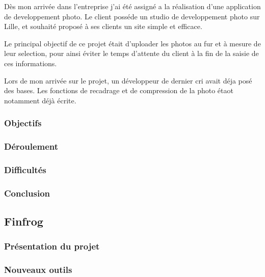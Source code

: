 \documentclass[12pt,a4paper]{article}
\begin{document}
  \bigskip

  Dès mon arrivée dans l'entreprise j'ai été assigné a la réalisation
  d'une application de developpement photo. Le client posséde un studio de
  developpement photo sur Lille, et souhaité proposé à ses clients un site
  simple et efficace.

  \bigskip

  Le principal objectif de ce projet était d'uploader les photos au fur et
  à mesure de leur selection, pour ainsi éviter le temps d'attente du
  client à la fin de la saisie de ces informations.

  \bigskip

  Lors de mon arrivée sur le projet, un développeur de dernier cri avait
  déja posé des bases. Les fonctions de recadrage et de compression de la
  photo étaot notamment déjà écrite.

  \bigskip

  \subsubsection{Objectifs}\label{objectifs}

  \subsubsection{Déroulement}\label{duxe9roulement}

  \subsubsection{Difficultés}\label{difficultuxe9s}

  \subsubsection{Conclusion}\label{conclusion}

  \subsection{Finfrog}\label{finfrog}

  \subsubsection{Présentation du
  projet}\label{pruxe9sentation-du-projet-1}

  \subsubsection{Nouveaux outils}\label{nouveaux-outils}
\end{document}
